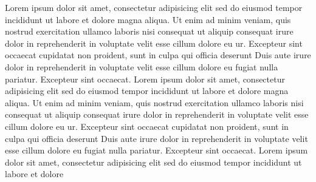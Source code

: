 \documentclass[a4paper, oneside, notitlepage, 12pt]{article}
\title{}
\date{}
\author{}
\begin{document}
\tableofcontents

\begin{pages}

\begin{Leftside}
\beginnumbering
{}
Lorem ipsum dolor sit amet, consectetur adipisicing elit
sed do eiusmod tempor incididunt ut labore et dolore
magna aliqua. Ut enim ad minim veniam, quis nostrud
exercitation ullamco laboris nisi
 consequat ut aliquip consequat\pend[\vskip 2ex]
 irure dolor in reprehenderit
in voluptate velit esse cillum dolore eu ur. Excepteur sint occaecat
cupidatat non proident, sunt in culpa qui officia deserunt
Duis aute irure dolor in reprehenderit
in voluptate velit esse cillum dolore eu fugiat nulla
pariatur. Excepteur sint occaecat.
\pend
{}
Lorem ipsum dolor sit amet, consectetur adipisicing elit
sed do eiusmod tempor incididunt ut labore et dolore
magna aliqua. Ut enim ad minim veniam, quis nostrud
exercitation ullamco laboris nisi
 consequat ut aliquip consequat\pend[\vskip 2ex]
 irure dolor in reprehenderit
in voluptate velit esse cillum dolore eu ur. Excepteur sint occaecat
cupidatat non proident, sunt in culpa qui officia deserunt
Duis aute irure dolor in reprehenderit
in voluptate velit esse cillum dolore eu fugiat nulla
pariatur. Excepteur sint occaecat.
\pend
{}
Lorem ipsum dolor sit amet, consectetur adipisicing elit
sed do eiusmod tempor incididunt ut labore et dolore

\end{Leftside}
\end{pages}
\end{document}
